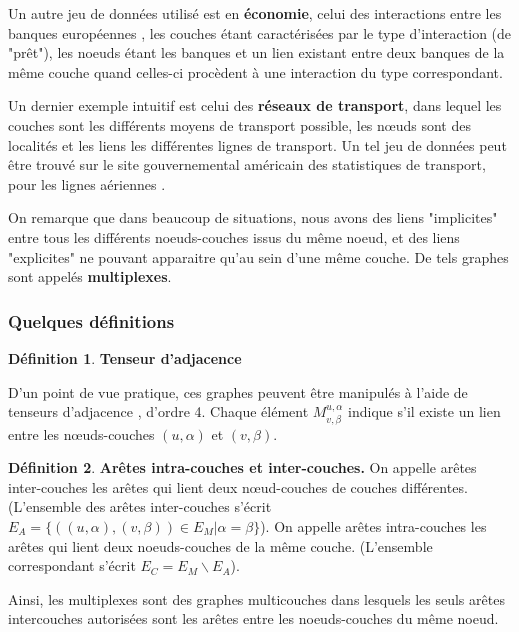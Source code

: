 \documentclass[11pt,a4paper]{article}
\theoremstyle{definition}
\newtheorem{defn}{Définition}
\theoremstyle{remark}
\theoremstyle{remark}
\begin{document}
Un autre jeu de données utilisé est en \textbf{économie}, celui des interactions entre les banques européennes \cite{interbank}, les couches étant caractérisées par le type d'interaction (de "prêt"), les noeuds étant les banques et un lien existant entre deux banques de la même couche quand celles-ci procèdent à une interaction du type correspondant.

Un dernier exemple intuitif est celui des \textbf{réseaux de transport}, dans lequel les couches sont les différents moyens de transport possible, les nœuds sont des localités et les liens les différentes lignes de transport. Un tel jeu de données peut être trouvé sur le site gouvernemental américain des statistiques de transport, pour les lignes aériennes \cite{plane}.

On remarque que dans beaucoup de situations, nous avons des liens "implicites" entre tous les différents noeuds-couches issus du même noeud, et des liens "explicites" ne pouvant apparaitre qu'au sein d'une même couche. De tels graphes sont appelés \textbf{multiplexes}.






\subsubsection{Quelques définitions}

\begin{defn}{\textbf{Tenseur d'adjacence}}
	
\end{defn}
D'un point de vue pratique, ces graphes peuvent être manipulés à l'aide de tenseurs d'adjacence \cite{mldd}, d'ordre 4. Chaque élément $M^{u,\alpha}_{v,\beta}$ indique s'il existe un lien entre les nœuds-couches $(u,\alpha)$ et $(v,\beta)$.

\begin{defn}{\textbf{Arêtes intra-couches et inter-couches.}}
	On appelle arêtes inter-couches les arêtes qui lient deux nœud-couches de couches différentes. (L'ensemble des arêtes inter-couches s'écrit $E_A = \{((u,\alpha),(v,\beta)) \in E_M | \alpha = \beta\}$). On appelle arêtes intra-couches les arêtes qui lient deux noeuds-couches de la même couche. (L'ensemble correspondant s'écrit $E_C = E_M\backslash E_A$).
\end{defn}
Ainsi, les multiplexes sont des graphes multicouches dans lesquels les seuls arêtes intercouches autorisées sont les arêtes entre les noeuds-couches du même noeud.
\end{document}
